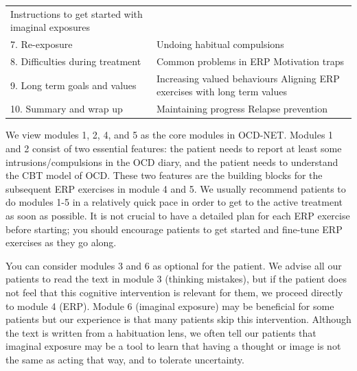 \documentclass[]{book}
\theoremstyle{definition}
\theoremstyle{definition}
\theoremstyle{definition}
\theoremstyle{remark}
\begin{document}
\begin{longtable}[]{@{}ll@{}}
\begin{minipage}[t]{0.47\columnwidth}
Instructions to get started with imaginal exposures\strut
\end{minipage}\tabularnewline
\begin{minipage}[t]{0.47\columnwidth}\raggedright
7. Re-exposure\strut
\end{minipage} & \begin{minipage}[t]{0.47\columnwidth}\raggedright
Undoing habitual compulsions\strut
\end{minipage}\tabularnewline
\begin{minipage}[t]{0.47\columnwidth}\raggedright
8. Difficulties during treatment\strut
\end{minipage} & \begin{minipage}[t]{0.47\columnwidth}\raggedright
Common problems in ERP Motivation traps\strut
\end{minipage}\tabularnewline
\begin{minipage}[t]{0.47\columnwidth}\raggedright
9. Long term goals and values\strut
\end{minipage} & \begin{minipage}[t]{0.47\columnwidth}\raggedright
Increasing valued behaviours Aligning ERP exercises with long term
values\strut
\end{minipage}\tabularnewline
\begin{minipage}[t]{0.47\columnwidth}\raggedright
10. Summary and wrap up\strut
\end{minipage} & \begin{minipage}[t]{0.47\columnwidth}\raggedright
Maintaining progress Relapse prevention\strut
\end{minipage}\tabularnewline
\bottomrule
\end{longtable}

We view modules 1, 2, 4, and 5 as the core modules in OCD-NET. Modules 1
and 2 consist of two essential features: the patient needs to report at
least some intrusions/compulsions in the OCD diary, and the patient
needs to understand the CBT model of OCD. These two features are the
building blocks for the subsequent ERP exercises in module 4 and 5. We
usually recommend patients to do modules 1-5 in a relatively quick pace
in order to get to the active treatment as soon as possible. It is not
crucial to have a detailed plan for each ERP exercise before starting;
you should encourage patients to get started and fine-tune ERP exercises
as they go along.

You can consider modules 3 and 6 as optional for the patient. We advise
all our patients to read the text in module 3 (thinking mistakes), but
if the patient does not feel that this cognitive intervention is
relevant for them, we proceed directly to module 4 (ERP). Module 6
(imaginal exposure) may be beneficial for some patients but our
experience is that many patients skip this intervention. Although the
text is written from a habituation lens, we often tell our patients that
imaginal exposure may be a tool to learn that having a thought or image
is not the same as acting that way, and to tolerate uncertainty.
\end{document}
